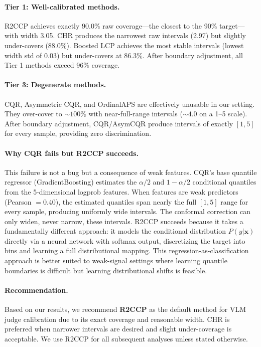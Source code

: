 \documentclass{article}
\begin{document}
\paragraph{Tier 1: Well-calibrated methods.} R2CCP achieves exactly 90.0\% raw coverage---the closest to the 90\% target---with width 3.05. CHR produces the narrowest raw intervals (2.97) but slightly under-covers (88.0\%). Boosted LCP achieves the most stable intervals (lowest width std of 0.03) but under-covers at 86.3\%. After boundary adjustment, all Tier 1 methods exceed 96\% coverage.

\paragraph{Tier 3: Degenerate methods.} CQR, Asymmetric CQR, and OrdinalAPS are effectively unusable in our setting. They over-cover to ${\sim}100\%$ with near-full-range intervals (${\sim}4.0$ on a 1--5 scale). After boundary adjustment, CQR/AsymCQR produce intervals of exactly $[1, 5]$ for every sample, providing zero discrimination.

\paragraph{Why CQR fails but R2CCP succeeds.} This failure is not a bug but a consequence of weak features. CQR's base quantile regressor (GradientBoosting) estimates the $\alpha/2$ and $1-\alpha/2$ conditional quantiles from the 5-dimensional logprob features. When features are weak predictors (Pearson $= 0.40$), the estimated quantiles span nearly the full $[1, 5]$ range for every sample, producing uniformly wide intervals. The conformal correction can only widen, never narrow, these intervals. R2CCP succeeds because it takes a fundamentally different approach: it models the conditional distribution $P(y|\mathbf{x})$ directly via a neural network with softmax output, discretizing the target into bins and learning a full distributional mapping. This regression-as-classification approach is better suited to weak-signal settings where learning quantile boundaries is difficult but learning distributional shifts is feasible.

\paragraph{Recommendation.} Based on our results, we recommend \textbf{R2CCP} as the default method for VLM judge calibration due to its exact coverage and reasonable width. CHR is preferred when narrower intervals are desired and slight under-coverage is acceptable. We use R2CCP for all subsequent analyses unless stated otherwise.
\end{document}
